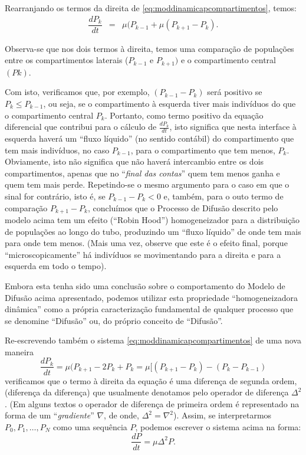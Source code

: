     Rearranjando os termos da direita de \eqref{eq:moddinamicapcompartimentos}, temos:
    \begin{eqnarray}
    \dfrac{dP_k}{dt} &=& \mu (P_{k-1} + \mu (P_{k+1}-P_{k}).
    \end{eqnarray} 

    Observa-se que nos dois termos à direita, temos uma comparação de populações entre os compartimentos laterais (\(P_{k-1}\) e \(P_{k+1})\) e o compartimento central \((Pk)\).
    
    Com isto, verificamos que, por exemplo, \((P_{k-1}-P_{k})\) será positivo se \(P_{k} \le P_{k-1}\), ou seja, se o compartimento à esquerda tiver mais indivíduos do que o compartimento central \(P_{k}\). Portanto, como termo positivo da equação diferencial que contribui para o cálculo de \(\frac{dP_{k}}{dt}\), isto significa que nesta interface à esquerda haverá um ``fluxo líquido'' (no sentido contábil) do compartimento que tem mais indivíduos, no caso \(P_{k-1}\), para o compartimento que tem menos, \(P_k\). Obviamente, isto não significa que não haverá intercambio entre os dois compartimentos, apenas que no ``\textit{final das contas}'' quem tem menos ganha e quem tem mais perde. Repetindo-se o mesmo argumento para o caso em que o sinal for contrário, isto é, se \(P_{k-1}-P_{k} < 0\) e, também, para o outo termo de comparação \(P_{k+1}-P_{k}\), concluímos que o Processo de Difusão descrito pelo modelo acima tem um efeito (``Robin Hood'') homogeneizador para a distribuição de populações ao longo do tubo, produzindo um ``fluxo líquido'' de onde tem mais para onde tem menos. (Mais uma vez, observe que este é o efeito final, porque ``microscopicamente'' há indivíduos se movimentando para a direita e para a esquerda em todo o tempo).

    Embora esta tenha sido uma conclusão sobre o comportamento do Modelo de Difusão acima apresentado, podemos utilizar esta propriedade ``homogeneizadora dinâmica'' como a própria caracterização fundamental de qualquer processo que se denomine ``Difusão'' ou, do próprio conceito de ``Difusão''. 

    Re-escrevendo também o sistema \eqref{eq:moddinamicapcompartimentos} de uma nova maneira \[\dfrac{dP_k}{dt} = \mu (P_{k+1}-2P_{k} + P_{k} = \mu [(P_{k+1}-P_{k}) - (P_k - P_{k-1})\] 
    verificamos que o termo à direita da equação é uma diferença de segunda ordem, (diferença da diferença) que usualmente denotamos pelo operador de diferença \(\Delta^2\). (Em alguns textos o operador de diferença de primeira ordem é representado na forma de um ``\textit{gradiente}'' \(\nabla\), de onde, \(\Delta^2 = \nabla^2\)). Assim, se interpretarmos \(P_0, P_1, \ldots, P_N\) como uma sequência \(P\), podemos escrever o sistema acima na forma:
    \[\dfrac{dP}{dt} = \mu \Delta^2 P.\] 

